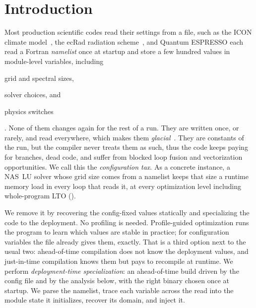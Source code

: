 \section{Introduction}
\label{sec:intro}

Most production scientific codes read their settings from a file, such as the ICON climate model~\cite{icon}, the ecRad radiation scheme~\cite{ecrad2024}, and Quantum ESPRESSO each read a Fortran \emph{namelist} once at startup and store a few hundred values in module-level variables, including \begin{enumerate*}[label=(\roman*)] \item grid and spectral sizes, \item solver choices, and \item physics switches\end{enumerate*}. None of them changes again for the rest of a run. They are written once, or rarely, and read everywhere, which makes them \emph{glacial}~\cite{glacial}. They are constants of the run, but the compiler never treats them as such, thus the code keeps paying for branches, dead code, and suffer from blocked loop fusion and vectorization opportunities. We call this the \emph{configuration tax}. As a concrete instance, a NAS~LU solver whose grid size comes from a namelist keeps that size a runtime memory load in every loop that reads it, at every optimization level including whole-program LTO ().

We remove it by recovering the config-fixed values statically and specializing the code to the deployment. No profiling is needed. Profile-guided optimization runs the program to learn which values are stable in practice; for configuration variables the file already gives them, exactly. That is a third option next to the usual two: ahead-of-time compilation does not know the deployment values, and just-in-time compilation knows them but pays to recompile at runtime. We perform \emph{deployment-time specialization}: an ahead-of-time build driven by the config file and by the analysis below, with the right binary chosen once at startup. We parse the namelist, trace each variable across the read into the module state it initializes, recover its domain, and inject it.

